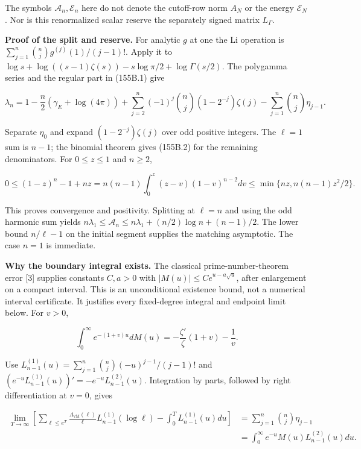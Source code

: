 \documentclass[
  11pt,
]{book}
\begin{document}
The symbols \(\mathcal A_n,\mathcal E_n\) here do not denote the
cutoff-row norm \(A_N\) or the energy \(\mathscr E_N\). Nor is this
renormalized scalar reserve the separately signed matrix \(L_\Gamma\).

\textbf{Proof of the split and reserve.} For analytic \(g\) at one the
Li operation is \(\sum_{j=1}^n\binom nj g^{(j)}(1)/(j-1)!\). Apply it to
\(\log s+\log((s-1)\zeta(s))-s\log\pi/2+\log\Gamma(s/2)\). The polygamma
series and the regular part in (155B.1) give

\[
\lambda_n=1-\frac n2(\gamma_E+\log(4\pi))
 +\sum_{j=2}^n(-1)^j\binom nj(1-2^{-j})\zeta(j)
 -\sum_{j=1}^n\binom nj\eta_{j-1}.
\tag{155B.3}
\]

Separate \(\eta_0\) and expand \((1-2^{-j})\zeta(j)\) over odd positive
integers. The \(\ell=1\) sum is \(n-1\); the binomial theorem gives
(155B.2) for the remaining denominators. For \(0\le z\le1\) and
\(n\ge2\),

\[
0\le(1-z)^n-1+nz
=n(n-1)\int_0^z(z-v)(1-v)^{n-2}dv
\le\min\{nz,n(n-1)z^2/2\}.
\]

This proves convergence and positivity. Splitting at \(\ell=n\) and
using the odd harmonic sum yields
\(n\lambda_1\le\mathcal A_n\le n\lambda_1+(n/2)\log n+(n-1)/2\). The
lower bound \(n/\ell-1\) on the initial segment supplies the matching
asymptotic. The case \(n=1\) is immediate.

\textbf{Why the boundary integral exists.} The classical
prime-number-theorem error {[}3{]} supplies constants \(C,a>0\) with
\(|M(u)|\le C e^{u-a\sqrt u}\), after enlargement on a compact interval.
This is an unconditional existence bound, not a numerical interval
certificate. It justifies every fixed-degree integral and endpoint limit
below. For \(v>0\),

\[
\int_0^\infty e^{-(1+v)u}dM(u)
=-\frac{\zeta'}{\zeta}(1+v)-\frac1v.
\]

Use \(L_{n-1}^{(1)}(u)=\sum_{j=1}^n\binom nj(-u)^{j-1}/(j-1)!\) and
\((e^{-u}L_{n-1}^{(1)}(u))'=-e^{-u}L_{n-1}^{(2)}(u)\). Integration by
parts, followed by right differentiation at \(v=0\), gives

\[
\begin{aligned}
\lim_{T\to\infty}\left[
 \sum_{\ell\le e^T}\frac{\Lambda_{\mathrm{vM}}(\ell)}{\ell}
 L_{n-1}^{(1)}(\log\ell)-\int_0^T L_{n-1}^{(1)}(u)du\right]
 &=\sum_{j=1}^n\binom nj\eta_{j-1}\\
 &=\int_0^\infty e^{-u}M(u)L_{n-1}^{(2)}(u)du.
\end{aligned}
\tag{155B.4}
\]
\end{document}

